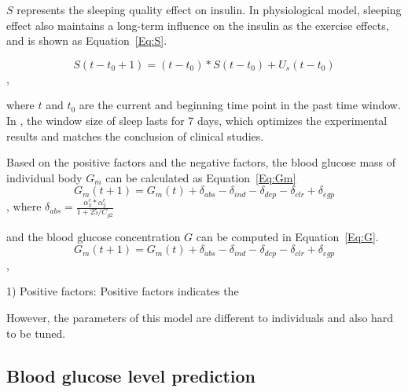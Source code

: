 $S$ represents the sleeping quality effect on insulin. In physiological model, sleeping 
effect also maintains a long-term influence on the insulin as the exercise effects,
and is shown as Equation~\ref{Eq:S}.

\begin{equation}\label{Eq:S}
S(t-t_0+1)=(t-t_0)*S(t-t_0)+U_{s}(t-t_0)
\end{equation},

where $t$ and $t_0$ are the current and beginning time point in the past time window. In \sysname,
the window size of sleep lasts for 7 days, which optimizes the experimental results and matches the conclusion
of clinical studies.

Based on the positive factors and the negative factors, the blood glucose mass of individual body 
$G_m$ can be calculated as Equation~\ref{Eq:Gm}
\begin{equation}\label{Eq:Gm}
G_m(t+1)=G_m(t)+\delta_{abs}-\delta_{ind}-\delta_{dep}-\delta_{clr}+\delta_{egp}
\end{equation},
where $\delta_{abs}=\frac{\alpha_3^c*\alpha_2^c}{1+25/C_{g2}}$

and the blood glucose concentration $G$ can be computed in Equation~\ref{Eq:G}.
\begin{equation}\label{Eq:G}
G_m(t+1)=G_m(t)+\delta_{abs}-\delta_{ind}-\delta_{dep}-\delta_{clr}+\delta_{egp}
\end{equation},

 
1) Positive factors:
Positive factors indicates the

However, the parameters of this model are different to individuals and also hard to be tuned.

\subsection{Blood glucose level prediction}


